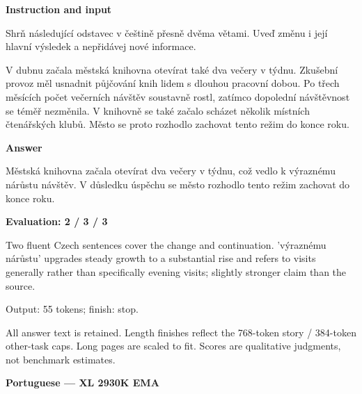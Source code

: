 \documentclass[10pt]{article}
\begin{document}
{\begin{minipage}{\textwidth}
\textbf{Instruction and input}\par Shrň následující odstavec v češtině přesně dvěma větami. Uveď změnu i její hlavní výsledek a nepřidávej nové informace.
\par\smallskip
V dubnu začala městská knihovna otevírat také dva večery v týdnu. Zkušební provoz měl usnadnit půjčování knih lidem s dlouhou pracovní dobou. Po třech měsících počet večerních návštěv soustavně rostl, zatímco dopolední návštěvnost se téměř nezměnila. V knihovně se také začalo scházet několik místních čtenářských klubů. Město se proto rozhodlo zachovat tento režim do konce roku.\par\smallskip
\textbf{Answer}\par Městská knihovna začala otevírat dva večery v týdnu, což vedlo k výraznému nárůstu návštěv. V důsledku úspěchu se město rozhodlo tento režim zachovat do konce roku.\par\smallskip
\textbf{Evaluation: 2 / 3 / 3}\par Two fluent Czech sentences cover the change and continuation. 'výraznému nárůstu' upgrades steady growth to a substantial rise and refers to visits generally rather than specifically evening visits; slightly stronger claim than the source.
\par {\color{gray} Output: 55 tokens; finish: stop.}\par
\medskip\footnotesize All answer text is retained. Length finishes reflect the 768-token story / 384-token other-task caps. Long pages are scaled to fit. Scores are qualitative judgments, not benchmark estimates.
\end{minipage}}%
\noindent\ifdim\dimexpr\ht\languagepage+\dp\languagepage\relax>0.93\textheight%
\resizebox*{!}{0.93\textheight}{\usebox{\languagepage}}%
\else\usebox{\languagepage}\fi%
\clearpage
{\Large\bfseries Portuguese --- XL 2930K EMA}\par\smallskip
\end{document}
